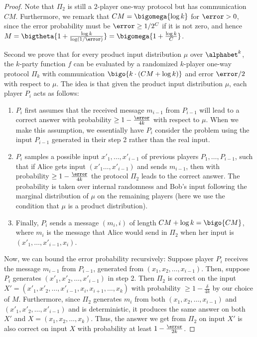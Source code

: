 \begin{proof}
Note that $\Pi_2$ is still a $2$-player one-way protocol but has communication ${CM}$. 
Furthermore, we remark that $CM=\bigomega{\log k}$ for $\error>0$, since the error probability must be $\error\ge 1/2^C$ if it is not zero, and hence $M=\bigtheta{1+\frac{\log k}{\log(1/\error)}}=\bigomega{1+\frac{\log k}{C}}$.




Second we prove that for every product input distribution $\mu$ over $\alphabet^k$, the $k$-party function $f$ can be evaluated by a randomized $k$-player one-way protocol $\Pi_k$ with communication $\bigo{k\cdot (CM+\log k)}$ and error $\error/2$ with respect to $\mu$.
The idea is that given the product input distribution $\mu$, each player $P_i$ acts as follows:
\begin{enumerate}
	\item $P_i$ first assumes that the received message $m_{i-1}$ from $P_{i-1}$ will lead to a correct answer with probability $\ge 1-\frac{\error}{4k}$ with respect to $\mu$. When we make this assumption, we essentially have $P_i$ consider the problem using the input $P_{i-1}$ generated in their step 2 rather than the real input.

	\item $P_i$ samples a possible input $x'_1,\dots,x'_{i-1}$ of previous players $P_1,\dots, P_{i-1}$, such that if Alice gets input $(x'_1\dots, x'_{i-1})$ and sends $m_{i-1}$, then with probability $\ge 1-\frac{\error}{4k}$ the protocol $\Pi_2$ leads to the correct answer. 
	The probability is taken over internal randomness and Bob's input following the marginal distribution of $\mu$ on the remaining players (here we use the condition that $\mu$ is a product distribution).

	\item Finally, $P_i$ sends a message $(m_i,i)$ of length $CM+\log k = \bigo{CM}$, where $m_i$ is the message that Alice would send in $\Pi_2$ when her input is $(x'_1,\dots,x'_{i-1},x_i)$.
\end{enumerate}

{\color{black} Now, we can bound the error probability recursively: Suppose player $P_i$ receives the message $m_{i-1}$ from $P_{i-1}$, generated from $(x_1, x_2, \dots, x_{i-1})$. Then, suppose $P_i$ generates $(x'_1, x'_2, \dots, x'_{i-1})$ in step 2. Then $\Pi_2$ is correct on the input $X' = (x'_1, x'_2, \dots, x'_{i-1}, x_i, x_{i+1}, \dots, x_k)$ with probability $\ge 1-\frac{\delta}{4k}$ by our choice of $M$. Furthermore, since $\Pi_2$ generates $m_i$ from both $(x_1, x_2, \dots, x_{i-1})$ and $(x'_1, x'_2, \dots, x'_{i-1})$ and is deterministic, it produces the same answer on both $X'$ and $X = (x_1, x_2, \dots, x_k)$. Thus, the answer we get from $\Pi_2$ on input $X'$ is also correct on input $X$ with probability at least $1-\frac{\error}{2k}$.}


\end{proof}
